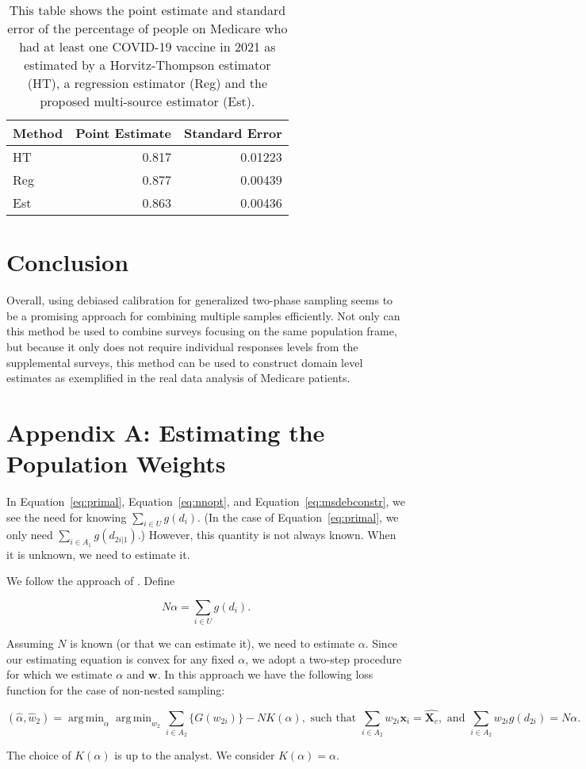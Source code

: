 \documentclass[12pt]{article}
\DeclareMathOperator*{\argmin}{arg\,min}
\renewcommand{\bf}[1]{\mathbf{#1}}
\begin{document}
\begin{table}[ht!]
  \centering
  \label{tab:mcbsres}
  \begin{tabular}{lrr}
    \toprule
    Method & Point Estimate & Standard Error \\
    \midrule
    HT  & 0.817 & 0.01223 \\
    Reg & 0.877 & 0.00439 \\
    Est & 0.863 & 0.00436 \\ 
    \bottomrule
  \end{tabular}
  \caption{This table shows the point estimate and standard error of the
  percentage of people on Medicare who had at least one COVID-19 vaccine in
  2021 as estimated by a Horvitz-Thompson estimator (HT), a regression estimator
  (Reg) and the proposed multi-source estimator (Est).}
\end{table}

\section{Conclusion}

Overall, using debiased calibration for generalized two-phase sampling seems to
be a promising approach for combining multiple samples efficiently. Not only can
this method be used to combine surveys focusing on the same population frame,
but because it only does not require individual responses levels from the
supplemental surveys, this method can be used to construct domain level
estimates as exemplified in the real data analysis of Medicare patients.




\section{Appendix A: Estimating the Population Weights}

In Equation~\ref{eq:primal}, Equation~\ref{eq:nnopt}, and
Equation~\ref{eq:msdebconstr}, we see the need for knowing $\sum_{i \in U}
g(d_i)$. (In the case of Equation~\ref{eq:primal}, we only need $\sum_{i \in
A_1} g(d_{2i|1})$.) However, this quantity is not always known. When it is
unknown, we need to estimate it.

We follow the approach of \cite{kwon2024debiased}. Define 

$$N \alpha = \sum_{i \in U} g(d_i).$$

Assuming $N$ is known (or that we can estimate it), we need to estimate
$\alpha$. Since our estimating equation is convex for any fixed $\alpha$, we
adopt a two-step procedure for which we estimate $\alpha$ and $\bf w$. In this
approach we have the following loss function for the case of non-nested sampling:

\begin{equation}\label{eq:nnalpha}
  (\hat \alpha, \hat w_2) = 
  \argmin_{\alpha} \argmin_{w_2} \sum_{i \in A_2} \{G(w_{2i})\} - NK(\alpha),
  \text{ such that } \sum_{i \in A_2} w_{2i} \bf x_i = \hat{\bf X_c},
  \text{ and } \sum_{i \in A_2} w_{2i} g(d_{2i}) = N\alpha.
\end{equation}

The choice of $K(\alpha)$ is up to the analyst. We consider $K(\alpha) =
\alpha$.
\end{document}
